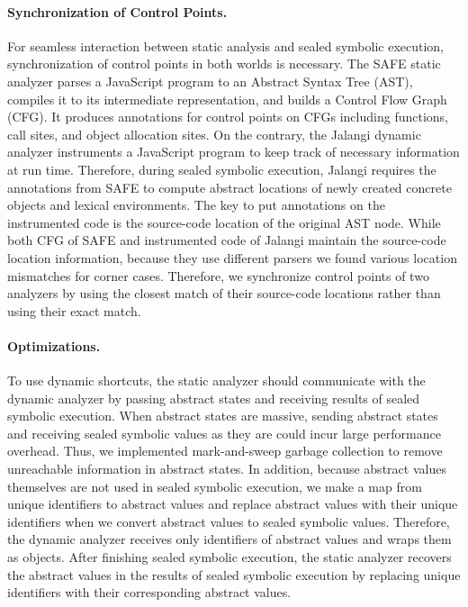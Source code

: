 \paragraph{Synchronization of Control Points.}
For seamless interaction between static analysis and sealed symbolic execution,
synchronization of control points in both worlds is necessary.
The SAFE static analyzer parses a JavaScript program to an Abstract
Syntax Tree (AST), compiles it to its intermediate representation, and
builds a Control Flow Graph (CFG).  It produces annotations for
control points on CFGs including functions, call sites, and object allocation sites.
On the contrary, the Jalangi dynamic analyzer instruments a JavaScript program 
to keep track of necessary information at run time.  Therefore, during
sealed symbolic execution, Jalangi requires the annotations from SAFE to compute
abstract locations of newly created concrete objects and lexical environments.
The key to put annotations on the instrumented code is the source-code
location of the original AST node.  While both CFG of SAFE and
instrumented code of Jalangi maintain the source-code location information,
because they use different parsers we found various location mismatches for corner cases.
Therefore, we synchronize control points of two analyzers by using the closest match
of their source-code locations rather than using their exact match.

\paragraph{Optimizations.}
To use dynamic shortcuts, the static analyzer should communicate with the
dynamic analyzer by passing abstract states and receiving results of sealed
symbolic execution.  When abstract states are massive, sending
abstract states and receiving sealed symbolic values as they are could
incur large performance overhead.  Thus, we
implemented mark-and-sweep garbage collection to remove unreachable
information in abstract states.  In addition, because abstract values
themselves are not used in sealed symbolic execution, we make a map
from unique identifiers to abstract values and replace
abstract values with their unique identifiers when we convert abstract
values to sealed symbolic values.  Therefore, the dynamic analyzer
receives only identifiers of abstract values and wraps them as
 objects.  After finishing sealed symbolic execution,
the static analyzer recovers the abstract values in the results of
sealed symbolic execution by replacing unique identifiers with their
corresponding abstract values.

